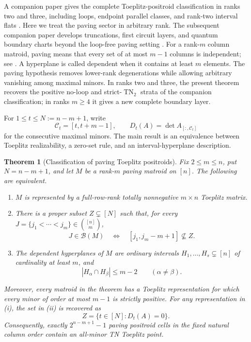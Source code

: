 \documentclass{amsart}
\numberwithin{equation}{section}
\newtheorem{theorem}{Theorem}
\theoremstyle{definition}
\theoremstyle{remark}
\DeclareMathOperator{\TN}{TN}
\newcommand{\cC}{\mathcal C}
\newcommand{\cB}{\mathcal B}
\begin{document}
A companion paper gives the complete Toeplitz-positroid classification in ranks two and three, including loops, endpoint parallel classes, and rank-two interval flats \cite{PaperA}.  Here we treat the paving sector in arbitrary rank.  The subsequent companion paper develops truncations, first circuit layers, and quantum boundary charts beyond the loop-free paving setting \cite{PaperC}.  For a rank-$m$ column matroid, paving means that every set of at most $m-1$ columns is independent; see \cite{Oxley}.  A hyperplane is called dependent when it contains at least $m$ elements.  The paving hypothesis removes lower-rank degenerations while allowing arbitrary vanishing among maximal minors.  In ranks two and three, the present theorem recovers the positive no-loop and strict-$\TN_2$ strata of the companion classification; in ranks $m\ge4$ it gives a new complete boundary layer.

For $1\le t\le N:=n-m+1$, write
\[
 \cC_t=[t,t+m-1],
 \qquad
 D_t(A)=\det A_{[:,\cC_t]}
\]
for the consecutive maximal minors.  The main result is an equivalence between Toeplitz realizability, a zero-set rule, and an interval-hyperplane description.

\begin{theorem}[Classification of paving Toeplitz positroids]\label{thm:main}
Fix $2\le m\le n$, put $N=n-m+1$, and let $M$ be a rank-$m$ paving matroid on $[n]$.  The following are equivalent.
\begin{enumerate}
\item[(i)] $M$ is represented by a full-row-rank totally nonnegative $m\times n$ Toeplitz matrix.
\item[(ii)] There is a proper subset $Z\subsetneq[N]$ such that, for every $J=\{j_1<\cdots<j_m\}\in\binom{[n]}m$,
\begin{equation}\label{eq:main-basis-rule}
 J\in\cB(M)
 \quad\Longleftrightarrow\quad
 [j_1,j_m-m+1]\nsubseteq Z.
\end{equation}
\item[(iii)] The dependent hyperplanes of $M$ are ordinary intervals $H_1,\ldots,H_s\subsetneq[n]$ of cardinality at least $m$, and
\begin{equation}\label{eq:main-intersection}
 |H_\alpha\cap H_\beta|\le m-2
 \qquad(\alpha\ne\beta).
\end{equation}
\end{enumerate}
Moreover, every matroid in the theorem has a Toeplitz representation for which every minor of order at most $m-1$ is strictly positive.  For any representation in (i), the set in (ii) is recovered as
\begin{equation}\label{eq:main-Z}
 Z=\{t\in[N]:D_t(A)=0\}.
\end{equation}
Consequently, exactly $2^{n-m+1}-1$ paving positroid cells in the fixed natural column order contain an all-minor TN Toeplitz point.
\end{theorem}
\end{document}

